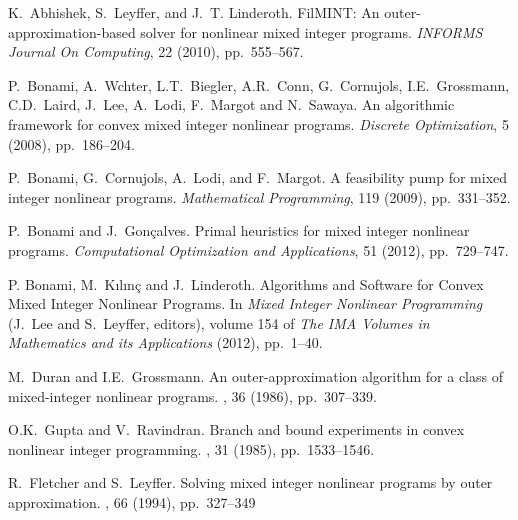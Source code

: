 \begin{PageSummary}
\end{PageSummary}
\begin{thebibliography}{10}

 K.~Abhishek, S.~Leyffer, and J.~T. Linderoth. FilMINT: An
  outer-ap\-pro\-xi\-mat\-ion-based solver for nonlinear mixed integer programs.
  {\em INFORMS Journal On Computing}, 22 (2010), pp.~555--567.

P.~Bonami, A.~W\auml chter, L.T.~Biegler, A.R.~Conn, G.~Cornu\eacute jols,
I.E.~Grossmann, C.D.~Laird, J.~Lee, A.~Lodi, F.~Margot and
N.~Sawaya.
\newblock An algorithmic framework for convex mixed integer nonlinear programs. {\em Discrete Optimization}, 5 (2008), pp.~186--204.
\newblock {}

{P.~Bonami, G.~Cornu\eacute jols, A.~Lodi, and F.~Margot}. {A feasibility
  pump for mixed integer nonlinear programs}. {\em Mathematical Programming}, 119
  (2009), pp.~331--352.

{P.~Bonami and J.~Gon{\c{c}}alves}. {Primal heuristics for mixed
  integer nonlinear programs}. 
  {\em Computational Optimization and Applications}, 51 (2012), pp.~729--747.

P. Bonami, M.~{K{\i}l{\i}n\c{c}} and J.~Linderoth.
Algorithms and Software for Convex Mixed Integer Nonlinear Programs.
In \emph{Mixed Integer Nonlinear Programming} (J.~Lee and S.~Leyffer, editors),
volume 154 of \emph{The IMA Volumes in Mathematics and its Applications} (2012),
pp.~1--40.

M.~Duran and I.E.~Grossmann.
\newblock An outer-approximation algorithm for a class of mixed-integer nonlinear programs.
, 36 (1986), pp.~307--339.
\newblock {}

O.K.~Gupta and V.~Ravindran.
\newblock Branch and bound experiments in convex nonlinear integer programming.
, 31 (1985), pp.~1533--1546.
\newblock {}

R.~Fletcher and S.~Leyffer.
\newblock Solving mixed integer nonlinear programs by outer approximation.
, 66 (1994), pp.~327--349
\newblock {}


\end{thebibliography}
